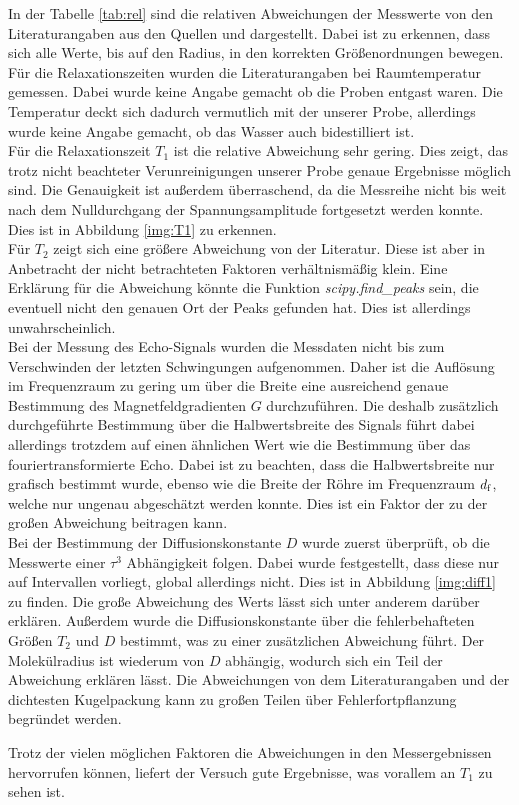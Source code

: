 \noindent
In der Tabelle \ref{tab:rel} sind die relativen Abweichungen der Messwerte von den Literaturangaben aus den Quellen \cite{theo} und \cite{radius} dargestellt.
Dabei ist zu erkennen, dass sich alle Werte, bis auf den Radius, in den korrekten Größenordnungen bewegen. 
Für die Relaxationszeiten wurden die Literaturangaben bei Raumtemperatur gemessen. Dabei wurde keine Angabe gemacht ob die Proben entgast waren.
Die Temperatur deckt sich dadurch vermutlich mit der unserer Probe, allerdings wurde keine Angabe gemacht, ob das Wasser auch bidestilliert ist.\\
Für die Relaxationszeit $T_1$ ist die relative Abweichung sehr gering. 
Dies zeigt, das trotz nicht beachteter Verunreinigungen unserer Probe genaue Ergebnisse möglich sind. 
Die Genauigkeit ist außerdem überraschend, da die Messreihe nicht bis weit nach dem Nulldurchgang der Spannungsamplitude fortgesetzt werden konnte. 
Dies ist in Abbildung \ref{img:T1} zu erkennen.\\
Für $T_2$ zeigt sich eine größere Abweichung von der Literatur. Diese ist aber in Anbetracht der nicht betrachteten Faktoren verhältnismäßig klein.
Eine Erklärung für die Abweichung könnte die Funktion \textit{scipy.find\_peaks} sein, 
die eventuell nicht den genauen Ort der Peaks gefunden hat. Dies ist allerdings unwahrscheinlich.\\
Bei der Messung des Echo-Signals wurden die Messdaten nicht bis zum Verschwinden der letzten Schwingungen aufgenommen.
Daher ist die Auflösung im Frequenzraum zu gering um über die Breite eine ausreichend genaue Bestimmung des Magnetfeldgradienten $G$ durchzuführen.
Die deshalb zusätzlich durchgeführte Bestimmung über die Halbwertsbreite des Signals 
führt dabei allerdings trotzdem auf einen ähnlichen Wert wie die Bestimmung über das fouriertransformierte Echo.
Dabei ist zu beachten, dass die Halbwertsbreite nur grafisch bestimmt wurde, ebenso wie die Breite der Röhre im Frequenzraum $d_{\text{f}}$, 
welche nur ungenau abgeschätzt werden konnte.
Dies ist ein Faktor der zu der großen Abweichung beitragen kann.\\
Bei der Bestimmung der Diffusionskonstante $D$ wurde zuerst überprüft, ob die Messwerte einer $\tau^3$ Abhängigkeit folgen.
Dabei wurde festgestellt, dass diese nur auf Intervallen vorliegt, global allerdings nicht.
Dies ist in Abbildung \ref{img:diff1} zu finden. 
Die große Abweichung des Werts lässt sich unter anderem darüber erklären. 
Außerdem wurde die Diffusionskonstante über die fehlerbehafteten Größen $T_2$ und $D$ bestimmt, was zu einer zusätzlichen Abweichung führt. 
Der Molekülradius ist wiederum von $D$ abhängig, wodurch sich ein Teil der Abweichung erklären lässt. 
Die Abweichungen von dem Literaturangaben und der dichtesten Kugelpackung kann zu großen Teilen über Fehlerfortpflanzung begründet werden.


\noindent
Trotz der vielen möglichen Faktoren die Abweichungen in den Messergebnissen hervorrufen können, liefert der Versuch gute Ergebnisse, was vorallem an $T_1$ zu sehen ist.
